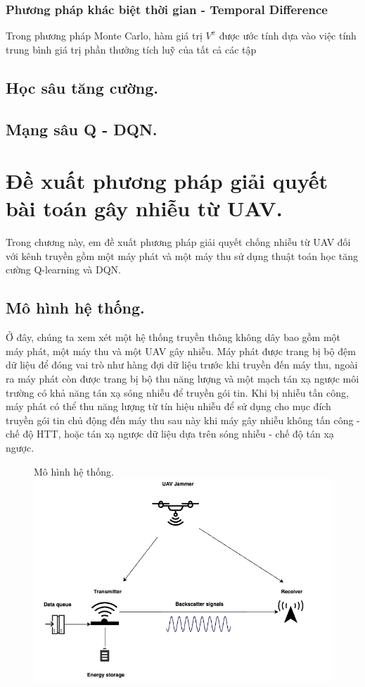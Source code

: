 \documentclass{uetgraduation}
\begin{document}
\subsection{Phương pháp khác biệt thời gian - Temporal Difference}
Trong phương pháp Monte Carlo, hàm giá trị $V^\pi$ được ước tính dựa vào việc tính trung bình giá trị phần thưởng tích luỹ của tất cả các tập

\section{Học sâu tăng cường.}

\section{Mạng sâu Q - DQN.}

\chapter{Đề xuất phương pháp giải quyết bài toán gây nhiễu từ UAV.}
Trong chương này, em đề xuất phương pháp giải quyết chống nhiễu từ UAV đối với kênh truyền gồm một máy phát và một máy thu sử dụng thuật toán học tăng cường Q-learning và DQN.


\section{Mô hình hệ thống.}
Ở đây, chúng ta xem xét một hệ thống truyền thông không dây bao gồm một máy phát, một máy thu và một UAV gây nhiễu. Máy phát được trang bị bộ đệm dữ liệu để đóng vai trò như hàng đợi dữ 
liệu trước khi truyền đến máy thu, ngoài ra máy phát còn được trang bị bộ thu năng lượng và một mạch tán xạ ngược môi trường có khả năng tán xạ sóng nhiễu để truyền gói tin. Khi bị nhiễu
tấn công, máy phát có thể thu năng lượng từ tín hiệu nhiễu để sử dụng cho mục đích truyền gói tin chủ
động đến máy thu sau này khi máy gây nhiễu không tấn công - chế độ HTT, hoặc tán xạ ngược dữ liệu dựa trên sóng nhiễu - chế độ tán xạ ngược.

\begin{figure}{Mô hình hệ thống.}
    \centering
    \includegraphics[scale=0.5]{system_model}
    \label{fig:system_model}
\end{figure}
\end{document}
